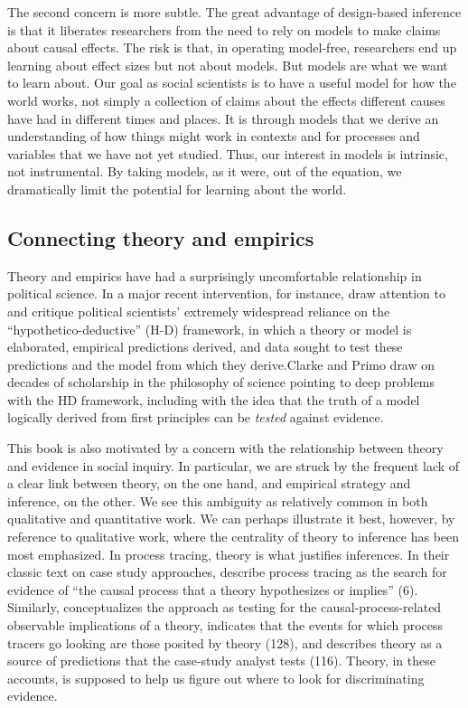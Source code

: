 \documentclass[12pt,]{book}
\begin{document}
The second concern is more subtle. The great advantage of design-based inference is that it liberates researchers from the need to rely on models to make claims about causal effects. The risk is that, in operating model-free, researchers end up learning about effect sizes but not about models. But models are what we want to learn about. Our goal as social scientists is to have a useful model for how the world works, not simply a collection of claims about the effects different causes have had in different times and places. It is through models that we derive an understanding of how things might work in contexts and for processes and variables that we have not yet studied. Thus, our interest in models is intrinsic, not instrumental. By taking models, as it were, out of the equation, we dramatically limit the potential for learning about the world.

\hypertarget{connecting-theory-and-empirics}{%
\subsection{Connecting theory and empirics}\label{connecting-theory-and-empirics}}

Theory and empirics have had a surprisingly uncomfortable relationship in political science. In a major recent intervention, for instance, \citet{clarke2012model} draw attention to and critique political scientists' extremely widespread reliance on the ``hypothetico-deductive'' (H-D) framework, in which a theory or model is elaborated, empirical predictions derived, and data sought to test these predictions and the model from which they derive.Clarke and Primo draw on decades of scholarship in the philosophy of science pointing to deep problems with the HD framework, including with the idea that the truth of a model logically derived from first principles can be \emph{tested} against evidence.

This book is also motivated by a concern with the relationship between theory and evidence in social inquiry. In particular, we are struck by the frequent lack of a clear link between theory, on the one hand, and empirical strategy and inference, on the other. We see this ambiguity as relatively common in both qualitative and quantitative work. We can perhaps illustrate it best, however, by reference to qualitative work, where the centrality of theory to inference has been most emphasized. In process tracing, theory is what justifies inferences. In their classic text on case study approaches, \citet{george2005case} describe process tracing as the search for evidence of ``the causal process that a theory hypothesizes or implies'' (6). Similarly, \citet{Hall2003aligning} conceptualizes the approach as testing for the causal-process-related observable implications of a theory, \citet{mahoney2010after} indicates that the events for which process tracers go looking are those posited by theory (128), and \citet{gerring2006case} describes theory as a source of predictions that the case-study analyst tests (116). Theory, in these accounts, is supposed to help us figure out where to look for discriminating evidence.
\end{document}
